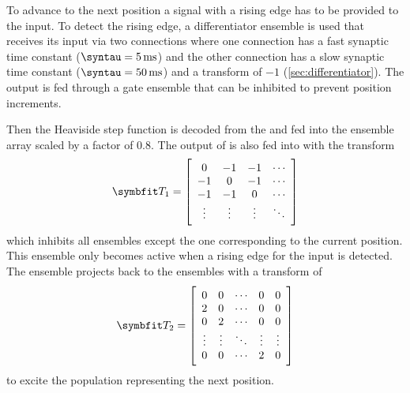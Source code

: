 To advance to the next position a signal with a rising edge has to be provided to the  input.
To detect the rising edge, a differentiator ensemble is used that receives its input via two connections where one connection has a fast synaptic time constant ($\syntau = \SI{5}{\milli\second}$) and the other connection has a slow synaptic time constant ($\syntau = \SI{50}{\milli\second}$) and a transform of $-1$ (\cref{sec:differentiator}).
The output is fed through a gate ensemble that can be inhibited to prevent position increments.

Then the Heaviside step function is decoded from the  and fed into the  ensemble array scaled by a factor of \num{0.8}.
The output of  is also fed into  with the transform
\begin{equation}
    \mat T_1 = \sbr{\begin{array}{cccc}
        0 & -1 & -1 & \cdots \\
        -1 & 0 & -1 & \cdots \\
        -1 & -1 & 0 & \cdots \\
        \vdots & \vdots & \vdots & \ddots
    \end{array}}
\end{equation}
which inhibits all ensembles except the one corresponding to the current position.
This ensemble only becomes active when a rising edge for the  input is detected.
The  ensemble projects back to the  ensembles with a transform of
\begin{equation}
    \mat T_2 = \sbr{\begin{array}{ccccc}
        0 & 0 & \cdots & 0 & 0 \\
        2 & 0 & \cdots & 0 & 0 \\
        0 & 2 & \cdots & 0 & 0 \\
        \vdots & \vdots & \ddots & \vdots & \vdots \\
        0 & 0 & \cdots & 2 & 0
    \end{array}}
\end{equation}
to excite the population representing the next position.

